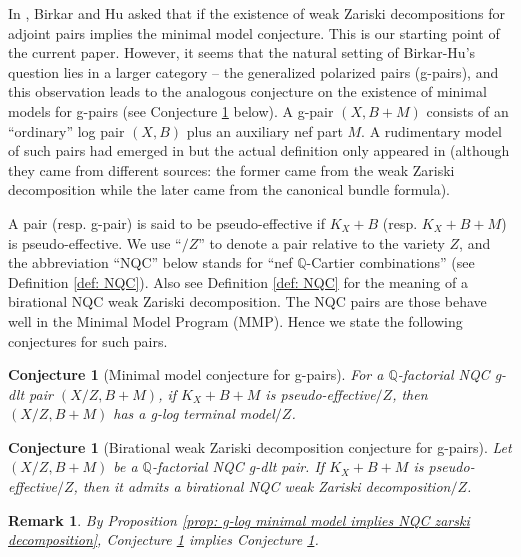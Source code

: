 \documentclass[11pt]{amsart}
\newcommand{\Qq}{\mathbb{Q}}
\newtheorem{remark}[theorem]{Remark}
\newtheorem{conjecture}[theorem]{Conjecture}
\begin{document}
In \cite{Birkarhuweak14}, Birkar and Hu asked that if the existence of weak Zariski decompositions for adjoint pairs implies the minimal model conjecture. This is our starting point of the current paper. However, it seems that the natural setting of Birkar-Hu's question lies in a larger category -- the generalized polarized pairs (g-pairs), and this observation leads to the analogous conjecture on the existence of minimal models for g-pairs (see Conjecture \ref{conj:glogmmp} below). A g-pair $(X, B+M)$ consists of an ``ordinary'' log pair $(X, B)$ plus an auxiliary nef part $M$. A rudimentary model of such pairs had emerged in \cite{Birkarweak12, Birkarhuweak14} but the actual definition only appeared in \cite{BZ16} (although they came from different sources: the former came from the weak Zariski decomposition while the later came from the canonical bundle formula).







A pair (resp. g-pair) is said to be pseudo-effective if $K_X+B$ (resp. $K_X+B+M$) is pseudo-effective. We use ``$/Z$'' to denote a pair relative to the variety $Z$, and the abbreviation ``NQC'' below stands for ``nef $\Qq$-Cartier combinations'' (see Definition \ref{def: NQC}). Also see Definition \ref{def: NQC} for the meaning of a birational NQC weak Zariski decomposition. The NQC pairs are those behave well in the Minimal Model Program (MMP). Hence we state the following conjectures for such pairs.

\begin{conjecture}[Minimal model conjecture for g-pairs]\label{conj:glogmmp}
For a $\Qq$-factorial NQC g-dlt pair $(X/Z,B+M)$, if $K_X+B+M$ is pseudo-effective$/Z$, then $(X/Z,B+M)$ has a g-log terminal model$/Z$.
\end{conjecture}

\begin{conjecture}[Birational weak Zariski decomposition conjecture for g-pairs]\label{conj: NQCbirweakzar} Let $(X/Z,B+M)$ be a $\Qq$-factorial NQC g-dlt pair. If $K_X+B+M$ is pseudo-effective$/Z$, then it admits a birational NQC weak Zariski decomposition$/Z$.
\end{conjecture}

\begin{remark}
By Proposition \ref{prop: g-log minimal model implies NQC zarski decomposition}, Conjecture \ref{conj:glogmmp} implies Conjecture \ref{conj: NQCbirweakzar}.
\end{remark}
\end{document}
